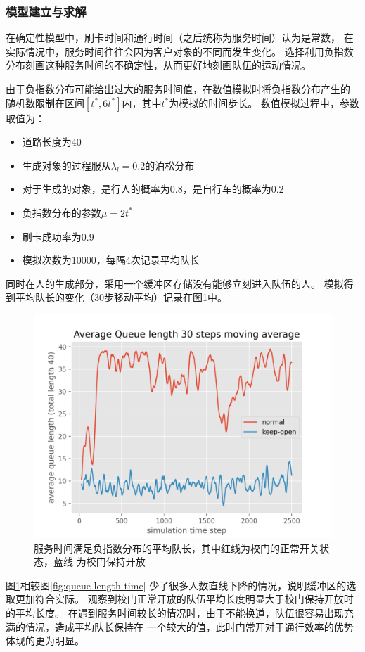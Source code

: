 \subsubsection{模型建立与求解}
在确定性模型中，刷卡时间和通行时间（之后统称为服务时间）认为是常数，
在实际情况中，服务时间往往会因为客户对象的不同而发生变化。
选择利用负指数分布刻画这种服务时间的不确定性，从而更好地刻画队伍的运动情况。
\par 由于负指数分布可能给出过大的服务时间值，在数值模拟时将负指数分布产生的
随机数限制在区间$[t^*, 6 t^*]$内，其中$t^*$为模拟的时间步长。
数值模拟过程中，参数取值为：
\begin{itemize}
    \item 道路长度为40
    \item 生成对象的过程服从$\lambda_l = 0.2$的泊松分布
    \item 对于生成的对象，是行人的概率为0.8，是自行车的概率为0.2
    \item 负指数分布的参数$\mu = 2t^*$
    \item 刷卡成功率为0.9
    \item 模拟次数为10000，每隔4次记录平均队长
\end{itemize}
同时在人的生成部分，采用一个缓冲区存储没有能够立刻进入队伍的人。
模拟得到平均队长的变化（30步移动平均）记录在图\ref{fig:average-length-with-exp}中。
\begin{figure}[ht]
    \centering
    \includegraphics[width=.6\textwidth]{images/avg_queue_length_with_exp.png}
    \caption{服务时间满足负指数分布的平均队长，其中红线为校门的正常开关状态，蓝线
    为校门保持开放}
    \label{fig:average-length-with-exp}
\end{figure}
图\ref{fig:average-length-with-exp}相较图\ref{fig:queue-length-time}
少了很多人数直线下降的情况，说明缓冲区的选取更加符合实际。
观察到校门正常开放的队伍平均长度明显大于校门保持开放时的平均长度。
在遇到服务时间较长的情况时，由于不能换道，队伍很容易出现充满的情况，造成平均队长保持在
一个较大的值，此时门常开对于通行效率的优势体现的更为明显。
